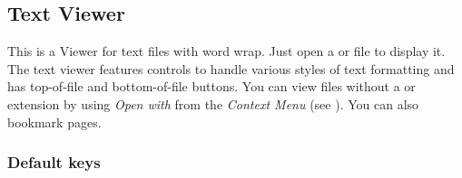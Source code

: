 \subsection{Text Viewer}
This is a Viewer for text files with word wrap. Just open a  or
 file to display it. The text viewer features controls to handle
various styles of text formatting and has top{}-of{}-file and bottom{}-of{}-file
buttons. You can view files without a  or  extension
by using \emph{Open with} from the \emph{Context Menu}
(see ). You can also bookmark pages.

\subsubsection{Default keys}
